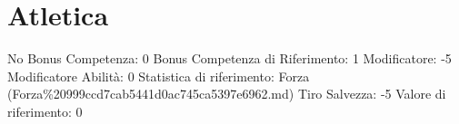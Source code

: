 \section{Atletica}\label{atletica}

\begin{description}
\tightlist
\item[Tags: ABI]
No Bonus Competenza: 0 Bonus Competenza di Riferimento: 1 Modificatore:
-5 Modificatore Abilità: 0 Statistica di riferimento: Forza
(Forza\%20999ccd7cab5441d0ac745ca5397e6962.md) Tiro Salvezza: -5 Valore
di riferimento: 0
\end{description}
